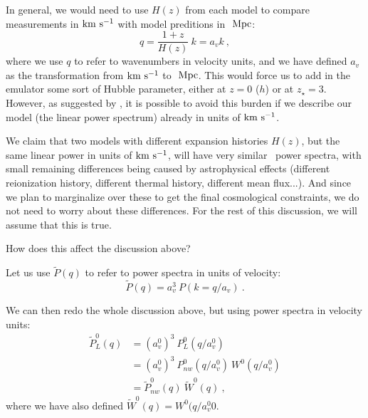 In general, we would need to use $H(z)$ from each model to compare 
measurements in ${\rm km~s^{-1}}$ with model preditions in $\ \text{Mpc}$:
\begin{equation}
 q = \frac{1+z}{H(z)} ~ k = a_v k~,
\end{equation}
where we use $q$ to refer to wavenumbers in velocity units, and we have 
defined $a_v$ as the transformation from ${\rm km~s^{-1}}$ to $\ \text{Mpc}$.
This would force us to add in the emulator some sort of Hubble 
parameter, either at $z=0$ ($h$) or at $z_\star=3$. 
However, as suggested by \cite{McDonald2005a}, it is possible to avoid this
burden if we describe our model (the linear power spectrum) already in 
units of ${\rm km~s^{-1}}$. 

We claim that two models with different expansion histories $H(z)$, but the
same linear power in units of ${\rm km~s^{-1}}$, will have very similar \lya\ power
spectra, with small remaining differences being caused by astrophysical 
effects (different reionization history, different thermal history, different
mean flux...). 
And since we plan to marginalize over these to get the final cosmological 
constraints, we do not need to worry about these differences. 
For the rest of this discussion, we will assume that this is true.

How does this affect the discussion above?

Let us use $\tilde P(q)$ to refer to power spectra in units of velocity:
\begin{equation}
 \tilde P(q) = a_v^3 ~ P(k= q / a_v) ~.
\end{equation}

We can then redo the whole discussion above, but using power spectra in 
velocity units:
\begin{align} 
 \tilde P^0_L(q) & = (a^0_v)^3 ~ P^0_L(q / a^0_v)         \nonumber \\
   & = (a^0_v)^3 ~ P^0_{nw}(q / a^0_v) ~ W^0(q / a^0_v)      \nonumber \\
   & = \tilde P^0_{nw}(q) ~ \tilde W^0(q)  ~,
\end{align}
where we have also defined $\tilde W^0(q) = W^0(q / a^0_v0$.

